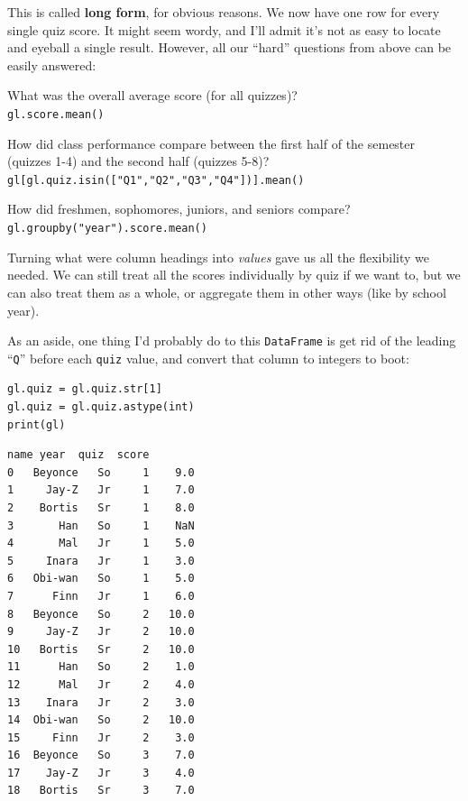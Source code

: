 
This is called \textbf{long form}, for obvious reasons. We now have one row for
every single quiz score. It might seem wordy, and I'll admit it's not as
easy to locate and eyeball a single result. However, all our ``hard'' questions
from above can be easily answered:


\begin{compactitem}
\small
\item[\leftthumbsup] What was the overall average score (for all quizzes)? \\
\texttt{gl.score.mean()}
\item[\leftthumbsup] How did class performance compare between the first half
of the semester (quizzes 1-4) and the second half (quizzes 5-8)? \\
\texttt{gl[gl.quiz.isin(["Q1","Q2","Q3","Q4"])].mean()}
\item[\leftthumbsup] How did freshmen, sophomores, juniors, and seniors
compare? \\ \texttt{gl.groupby("year").score.mean()}
\end{compactitem}

Turning what were column headings into \textit{values} gave us all the
flexibility we needed. We can still treat all the scores individually by quiz
if we want to, but we can also treat them as a whole, or aggregate them in
other ways (like by school year).

As an aside, one thing I'd probably do to this \texttt{DataFrame} is get rid of
the leading ``\texttt{Q}'' before each \texttt{quiz} value, and convert that
column to integers to boot:


\begin{Verbatim}[fontsize=\footnotesize,samepage=true,frame=single,framesep=3mm]
gl.quiz = gl.quiz.str[1]
gl.quiz = gl.quiz.astype(int)
print(gl)
\end{Verbatim}

\vspace{-.2in}

\begin{Verbatim}[fontsize=\scriptsize,samepage=true,frame=leftline,framesep=5mm,framerule=1mm,xleftmargin=1cm]
       name year  quiz  score
0   Beyonce   So     1    9.0
1     Jay-Z   Jr     1    7.0
2    Bortis   Sr     1    8.0
3       Han   So     1    NaN
4       Mal   Jr     1    5.0
5     Inara   Jr     1    3.0
6   Obi-wan   So     1    5.0
7      Finn   Jr     1    6.0
8   Beyonce   So     2   10.0
9     Jay-Z   Jr     2   10.0
10   Bortis   Sr     2   10.0
11      Han   So     2    1.0
12      Mal   Jr     2    4.0
13    Inara   Jr     2    3.0
14  Obi-wan   So     2   10.0
15     Finn   Jr     2    3.0
16  Beyonce   So     3    7.0
17    Jay-Z   Jr     3    4.0
18   Bortis   Sr     3    7.0
\end{Verbatim}

